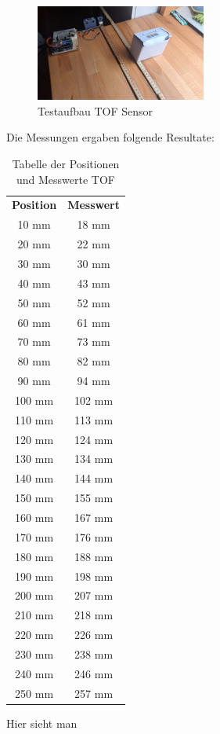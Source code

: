 \begin{figure}[h] %
    \centering
    \includegraphics[width=0.5\textwidth]{img/sensortest/TOF_Verschoben.jpg} %
    \caption{Testaufbau TOF Sensor}
    \label{fig:TOF1} %
\end{figure}



Die Messungen ergaben folgende Resultate:


\begin{table}[H]
    \centering
    \begin{tabular}{cc} %
        \textbf{Position} & \textbf{Messwert} \\ %
        10 mm  & 18 mm  \\
        20 mm  & 22 mm  \\
        30 mm  & 30 mm  \\
        40 mm  & 43 mm  \\
        50 mm  & 52 mm  \\
        60 mm  & 61 mm  \\
        70 mm  & 73 mm  \\
        80 mm  & 82 mm  \\
        90 mm  & 94 mm  \\
        100 mm & 102 mm \\
        110 mm & 113 mm \\
        120 mm & 124 mm \\
        130 mm & 134 mm \\
        140 mm & 144 mm \\
        150 mm & 155 mm \\
        160 mm & 167 mm \\
        170 mm & 176 mm \\
        180 mm & 188 mm \\
        190 mm & 198 mm \\
        200 mm & 207 mm \\
        210 mm & 218 mm \\
        220 mm & 226 mm \\
        230 mm & 238 mm \\
        240 mm & 246 mm \\
        250 mm & 257 mm \\
    \end{tabular}
    \caption{Tabelle der Positionen und Messwerte TOF}
    \label{tab:messwerte}
\end{table}
Hier sieht man 


